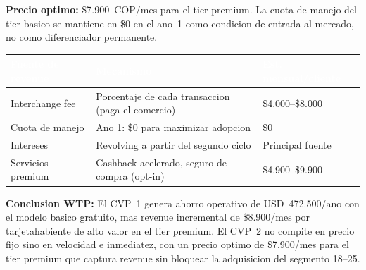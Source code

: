 \documentclass[12pt,a4paper]{article}
\begin{document}
\textbf{Precio optimo:} \$7.900~COP/mes para el tier premium. La cuota de manejo
del tier basico se mantiene en \$0 en el ano~1 como condicion de entrada al mercado,
no como diferenciador permanente.

\begin{center}
\begin{tabular}{L{3cm}L{4.5cm}C{2.8cm}}
\toprule
{}
\textcolor{white}{\textbf{Fuente de revenue}} &
\textcolor{white}{\textbf{Mecanismo}} &
\textcolor{white}{\textbf{Est. mensual/cliente}} \\
\midrule
Interchange fee    & Porcentaje de cada transaccion (paga el comercio) & \$4.000--\$8.000 \\
Cuota de manejo    & Ano 1: \$0 para maximizar adopcion                 & \$0 \\
Intereses          & Revolving a partir del segundo ciclo               & Principal fuente \\
Servicios premium  & Cashback acelerado, seguro de compra (opt-in)      & \$4.900--\$9.900 \\
\bottomrule
\end{tabular}
\end{center}

\begin{insight}
\textbf{Conclusion WTP:} El CVP~1 genera ahorro operativo de USD~472.500/ano
con el modelo basico gratuito, mas revenue incremental de \$8.900/mes por
tarjetahabiente de alto valor en el tier premium. El CVP~2 no compite en precio
fijo sino en velocidad e inmediatez, con un precio optimo de \$7.900/mes para el
tier premium que captura revenue sin bloquear la adquisicion del segmento 18--25.
\end{insight}
\end{document}
